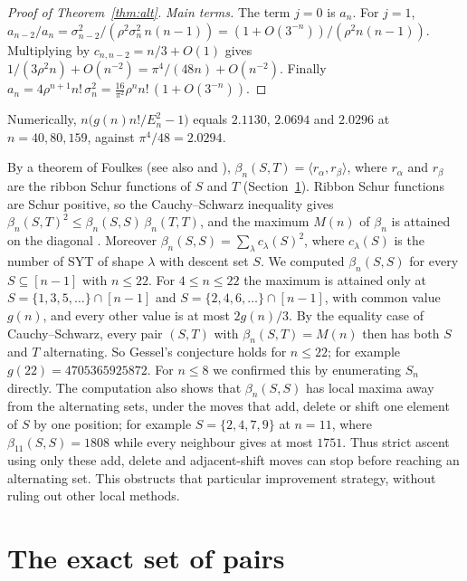 \documentclass[12pt]{article}
\numberwithin{theorem}{section}
\numberwithin{equation}{section}
\begin{document}
\begin{proof}[Proof of Theorem~\ref{thm:alt}]
\emph{Main terms.} The term $j=0$ is $a_n$. For $j=1$,
$a_{n-2}/a_n=\sigma_{n-2}^2/(\rho^2\sigma_n^2\,n(n-1))=(1+O(3^{-n}))/(\rho^2n(n-1))$. Multiplying by
$c_{n,n-2}=n/3+O(1)$ gives $1/(3\rho^2n)+O(n^{-2})=\pi^4/(48n)+O(n^{-2})$. Finally
$a_n=4\rho^{n+1}n!\,\sigma_n^2=\frac{16}{\pi^2}\rho^n n!\,(1+O(3^{-n}))$.
\end{proof}

Numerically, $n\bigl(g(n)n!/E_n^2-1\bigr)$ equals $2.1130$, $2.0694$ and $2.0296$ at $n=40,80,159$, against
$\pi^4/48=2.0294$.

\begin{remark}\label{rem:gessel}
By a theorem of Foulkes \cite{foulkes} (see also \cite{gessel} and \cite[Section~2.1]{gesselZhuang}), $\beta_n(S,T)=\langle r_\alpha,r_\beta\rangle$, where $r_\alpha$ and
$r_\beta$ are the ribbon Schur functions of $S$ and $T$ (Section~\ref{sec:criterion}). Ribbon Schur functions
are Schur positive, so the Cauchy--Schwarz inequality gives
$\beta_n(S,T)^2\le\beta_n(S,S)\,\beta_n(T,T)$, and the maximum $M(n)$ of $\beta_n$ is attained on the
diagonal \cite[Supplementary Problem~132(a)]{ec2second}. Moreover
$\beta_n(S,S)=\sum_\lambda c_\lambda(S)^2$, where $c_\lambda(S)$ is the number of SYT of shape $\lambda$ with
descent set $S$. We computed $\beta_n(S,S)$ for every $S\subseteq[n-1]$ with $n\le22$. For $4\le n\le22$ the
maximum is attained only at $S=\{1,3,5,\dots\}\cap[n-1]$ and $S=\{2,4,6,\dots\}\cap[n-1]$, with common value
$g(n)$, and every other value is at most $2g(n)/3$. By the equality case of Cauchy--Schwarz, every
pair $(S,T)$ with $\beta_n(S,T)=M(n)$ then has both $S$ and $T$ alternating. So Gessel's conjecture holds for
$n\le22$; for example $g(22)=4705365925872$. For $n\le8$ we confirmed this by enumerating $S_n$ directly. The computation also shows that
$\beta_n(S,S)$ has local maxima away from the alternating sets, under the moves that add, delete or shift
one element of $S$ by one position; for example $S=\{2,4,7,9\}$ at $n=11$, where $\beta_{11}(S,S)=1808$ while every neighbour gives at most $1751$. Thus strict ascent using only these add, delete and adjacent-shift moves can stop before reaching an alternating set. This obstructs that particular improvement strategy, without ruling out other local methods.
\end{remark}

\section{The exact set of pairs}\label{sec:criterion}
\end{document}
